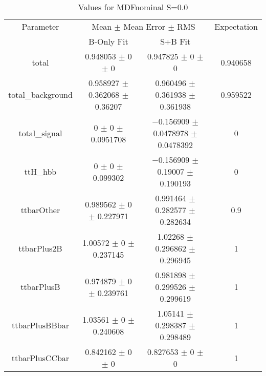 \begin{table}
\centering
\caption{Values for MDFnominal S=0.0}
\begin{tabular}{cccc}
\toprule
Parameter & \multicolumn{2}{c}{Mean $\pm$ Mean Error $\pm$ RMS} & Expectation\\
 & B-Only Fit & S+B Fit & \\
\midrule
total & \num{0.948053} $\pm$ \num{0} $\pm$ \num{0} & \num{0.947825} $\pm$ \num{0} $\pm$ \num{0} & \num{0.940658}\\
total\_background & \num{0.958927} $\pm$ \num{0.362068} $\pm$ \num{0.36207} & \num{0.960496} $\pm$ \num{0.361938} $\pm$ \num{0.361938} & \num{0.959522}\\
total\_signal & \num{0} $\pm$ \num{0} $\pm$ \num{0.0951708} & \num{-0.156909} $\pm$ \num{0.0478978} $\pm$ \num{0.0478392} & \num{0}\\
ttH\_hbb & \num{0} $\pm$ \num{0} $\pm$ \num{0.099302} & \num{-0.156909} $\pm$ \num{0.19007} $\pm$ \num{0.190193} & \num{0}\\
ttbarOther & \num{0.989562} $\pm$ \num{0} $\pm$ \num{0.227971} & \num{0.991464} $\pm$ \num{0.282577} $\pm$ \num{0.282634} & \num{0.9}\\
ttbarPlus2B & \num{1.00572} $\pm$ \num{0} $\pm$ \num{0.237145} & \num{1.02268} $\pm$ \num{0.296862} $\pm$ \num{0.296945} & \num{1}\\
ttbarPlusB & \num{0.974879} $\pm$ \num{0} $\pm$ \num{0.239761} & \num{0.981898} $\pm$ \num{0.299526} $\pm$ \num{0.299619} & \num{1}\\
ttbarPlusBBbar & \num{1.03561} $\pm$ \num{0} $\pm$ \num{0.240608} & \num{1.05141} $\pm$ \num{0.298387} $\pm$ \num{0.298489} & \num{1}\\
ttbarPlusCCbar & \num{0.842162} $\pm$ \num{0} $\pm$ \num{0} & \num{0.827653} $\pm$ \num{0} $\pm$ \num{0} & \num{1}\\
\bottomrule
\end{tabular}
\end{table}